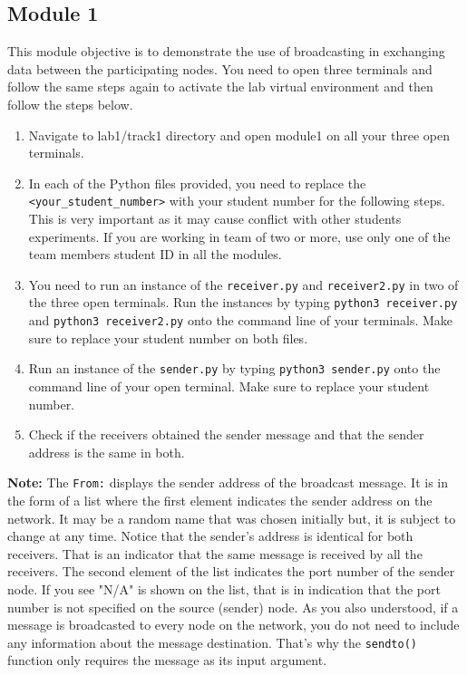 \documentclass[11pt]{article}
\begin{document}
\subsection{Module 1}
\label{subsec:module1}
This module objective is to demonstrate the use of broadcasting in exchanging data between the participating nodes. You need to open three terminals and follow the same steps again to activate the lab virtual environment and then follow the steps below.
\begin{enumerate}
    \item Navigate to lab1/track1 directory and open module1 on all your three open terminals.
    \item In each of the Python files provided, you need to replace the \texttt{<your\_student\_number>} with your student number for the following steps. This is very important as it may cause conflict with other students experiments. If you are working in team of two or more, use only one of the team members student ID in all the modules.
    \item You need to run an instance of the \texttt{receiver.py} and \texttt{receiver2.py} in two of the three open terminals. Run the instances by typing \texttt{python3 receiver.py} and \texttt{python3 receiver2.py} onto the command line of your terminals. Make sure to replace your student number on both files.
    \item Run an instance of the \texttt{sender.py} by typing \texttt{python3 sender.py} onto the command line of your open terminal. Make sure to replace your student number.
    \item Check if the receivers obtained the sender message and that the sender address is the same in both.
\end{enumerate}


\textbf{Note:}
The \texttt{From:} displays the sender address of the broadcast message. It is in the form of a list where the first element indicates the sender address on the network. It may be a random name that was chosen initially but, it is subject to change at any time. Notice that the sender's address is identical for both receivers. That is an indicator that the same message is received by all the receivers. The second element of the list indicates the port number of the sender node.
If you see "N/A" is shown on the list, that is in indication that the port number is not specified on the source (sender) node. As you also understood, if a message is broadcasted to every node on the network, you do not need to include any information about the message destination. That's why the \texttt{sendto()} function only requires the message as its input argument.
\end{document}
